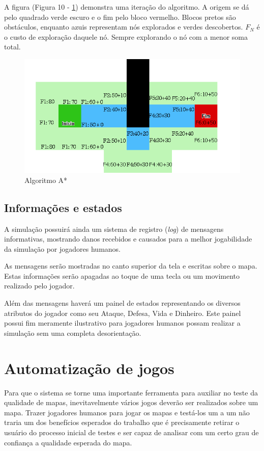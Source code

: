 A figura (Figura 10 - \ref{fig10}) demonstra uma iteração do algoritmo. A origem se dá pelo quadrado verde escuro e o fim pelo bloco vermelho. Blocos pretos são obstáculos, enquanto azuis representam nós explorados e verdes descobertos. $F_N$ é o custo de exploração daquele nó. Sempre explorando o nó com a menor soma total. 
\begin{figure}[h]
	\centering
	\label{fig10}
		\includegraphics[keepaspectratio=true,scale=0.5]{figuras/fig10-astar.png}
	\caption{Algoritmo A*}
\end{figure}

\subsection{Informações e estados}

A simulação possuirá ainda um sistema de registro (\textit{log}) de mensagens informativas, mostrando danos recebidos e causados para a melhor jogabilidade da simulação por jogadores humanos. 

As mensagens serão mostradas no canto superior da tela e escritas sobre o mapa. Estas informações serão apagadas ao toque de uma tecla ou um movimento realizado pelo jogador. 

Além das mensagens haverá um painel de estados representando os diversos atributos do jogador como seu Ataque, Defesa, Vida e Dinheiro. Este painel possui fim meramente ilustrativo para jogadores humanos possam realizar a simulação sem uma completa desorientação. 


\section{Automatização de jogos}

Para que o sistema se torne uma importante ferramenta para auxiliar no teste da qualidade de mapas, inevitavelmente vários jogos deverão ser realizados sobre um mapa. Trazer jogadores humanos para jogar os mapas e testá-los um a um não traria um dos benefícios esperados do trabalho que é precisamente retirar o usuário do processo inicial de testes e ser capaz de analisar com um certo grau de confiança a qualidade esperada do mapa. 

